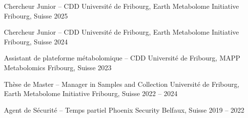 

\begin{cventries}


\cventry
  {Chercheur Junior – CDD} %
  {Université de Fribourg, Earth Metabolome Initiative} %
  {Fribourg, Suisse} %
  {2025} %
  {}

\cventry
  {Chercheur Junior – CDD} %
  {Université de Fribourg, Earth Metabolome Initiative} %
  {Fribourg, Suisse} %
  {2024} %
  {}

\cventry
  {Assistant de plateforme métabolomique – CDD} %
  {Université de Fribourg, MAPP Metabolomics} %
  {Fribourg, Suisse} %
  {2023} %
  {}

\cventry
  {Thèse de Master – Manager in Samples and Collection} %
  {Université de Fribourg, Earth Metabolome Initiative} %
  {Fribourg, Suisse} %
  {2022 -- 2024} %
  {}

\cventry
  {Agent de Sécurité – Temps partiel} %
  {Phoenix Security} %
  {Belfaux, Suisse} %
  {2019 -- 2022} %
  {}

\end{cventries}
